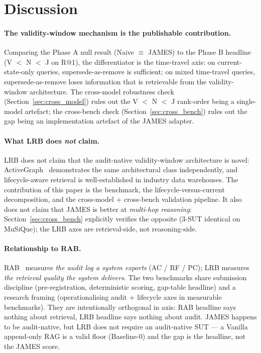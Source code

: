 \documentclass[11pt,a4paper]{article}
\begin{document}
\section{Discussion}
\label{sec:discussion}

\paragraph{The validity-window mechanism is the publishable contribution.} Comparing the Phase A null result (Naive $\equiv$ JAMES) to the Phase B headline (V $<$ N $<$ J on R@1), the differentiator is the time-travel axis: on current-state-only queries, supersede-as-remove is sufficient; on mixed time-travel queries, supersede-as-remove loses information that is retrievable from the validity-window architecture. The cross-model robustness check (Section~\ref{sec:cross_model}) rules out the V $<$ N $<$ J rank-order being a single-model artefact; the cross-bench check (Section~\ref{sec:cross_bench}) rules out the gap being an implementation artefact of the JAMES adapter.

\paragraph{What LRB does \emph{not} claim.} LRB does not claim that the audit-native validity-window architecture is novel: ActiveGraph~\cite{nakajima2026activegraph} demonstrates the same architectural class independently, and lifecycle-aware retrieval is well-established in industry data warehouses. The contribution of this paper is the benchmark, the lifecycle-versus-current decomposition, and the cross-model + cross-bench validation pipeline. It also does not claim that JAMES is better at \emph{multi-hop reasoning}: Section~\ref{sec:cross_bench} explicitly verifies the opposite (3-SUT identical on MuSiQue); the LRB axes are retrieval-side, not reasoning-side.

\paragraph{Relationship to RAB.} RAB~\cite{seo2026rab} measures \emph{the audit log a system exports} (AC / RF / PC); LRB measures \emph{the retrieval quality the system delivers}. The two benchmarks share submission discipline (pre-registration, deterministic scoring, gap-table headline) and a research framing (operationalising audit + lifecycle axes in measurable benchmarks). They are intentionally orthogonal in axis: RAB headline says nothing about retrieval, LRB headline says nothing about audit. JAMES happens to be audit-native, but LRB does not require an audit-native SUT --- a Vanilla append-only RAG is a valid floor (Baseline-0) and the gap is the headline, not the JAMES score.
\end{document}
